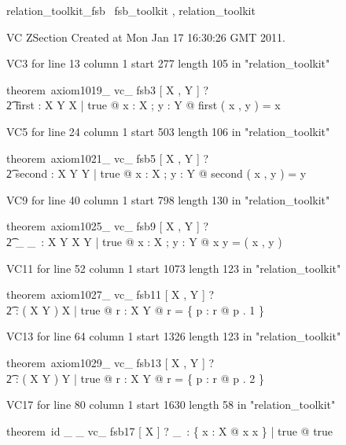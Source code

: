 \documentclass{article}
\begin{document}

\begin{zsection}
	 \SECTION relation\_toolkit\_fsb \parents~fsb\_toolkit , relation\_toolkit
\end{zsection}

VC ZSection Created at Mon Jan 17 16:30:26 GMT 2011.

VC3 for line 13 column 1 start 277 length 105 in "relation_toolkit"
\begin{zed}
theorem~axiom1019\_ vc\_ fsb3 [ X , Y ] \vdash ? \\
   \t2 \exists first : X \cross Y \fun X | true @ \forall x : X ; y : Y @ first ( x , y ) = x
\end{zed}

VC5 for line 24 column 1 start 503 length 106 in "relation_toolkit"
\begin{zed}
theorem~axiom1021\_ vc\_ fsb5 [ X , Y ] \vdash ? \\
   \t2 \exists second : X \cross Y \fun Y | true @ \forall x : X ; y : Y @ second ( x , y ) = y
\end{zed}

VC9 for line 40 column 1 start 798 length 130 in "relation_toolkit"
\begin{zed}
theorem~axiom1025\_ vc\_ fsb9 [ X , Y ] \vdash ? \\
   \t2 \exists \_ \mapsto \_~: X \cross Y \fun X \cross Y | true @ \forall x : X ; y : Y @ x \mapsto y = ( x , y )
\end{zed}

VC11 for line 52 column 1 start 1073 length 123 in "relation_toolkit"
\begin{zed}
theorem~axiom1027\_ vc\_ fsb11 [ X , Y ] \vdash ? \\
   \t2 \exists \dom : ( X \rel Y ) \fun \power X | true @ \forall r : X \rel Y @ \dom r = \{ p : r @ p . 1 \}
\end{zed}

VC13 for line 64 column 1 start 1326 length 123 in "relation_toolkit"
\begin{zed}
theorem~axiom1029\_ vc\_ fsb13 [ X , Y ] \vdash ? \\
   \t2 \exists \ran : ( X \rel Y ) \fun \power Y | true @ \forall r : X \rel Y @ \ran r = \{ p : r @ p . 2 \}
\end{zed}

VC17 for line 80 column 1 start 1630 length 58 in "relation_toolkit"
\begin{zed}
theorem~id \_  \_ vc\_ fsb17 [ X ] \vdash ? \exists \id \_~: \power \{ x : X @ x \mapsto x \} | true @ true
\end{zed}
\end{document}
